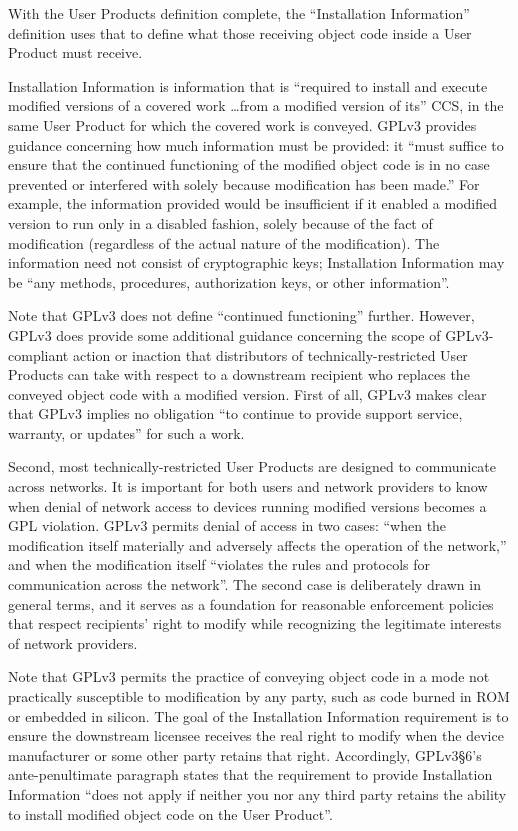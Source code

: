 With the User Products definition complete, the ``Installation Information''
definition uses that to define what those receiving object code inside a User
Product must receive.

Installation Information is information that is ``required to install and
execute modified versions of a covered work \dots from a modified version of
its'' CCS, in the same User Product for which the covered work is conveyed.
GPLv3 provides guidance concerning how much information must be provided: it
``must suffice to ensure that the continued functioning of the modified
object code is in no case prevented or interfered with solely because
modification has been made.''  For example, the information provided would be
insufficient if it enabled a modified version to run only in a disabled
fashion, solely because of the fact of modification (regardless of the actual
nature of the modification).  The information need not consist of
cryptographic keys; Installation Information may be ``any methods,
procedures, authorization keys, or other information''.

Note that GPLv3 does not define ``continued functioning'' further.  However,
GPLv3 does provide some additional guidance concerning the scope of
GPLv3-compliant action or inaction that distributors of
technically-restricted User Products can take with respect to a downstream
recipient who replaces the conveyed object code with a modified version.
First of all, GPLv3 makes clear that GPLv3 implies no obligation ``to
continue to provide support service, warranty, or updates'' for such a work.

Second, most technically-restricted User Products are designed to communicate
across networks.  It is important for both users and network providers to
know when denial of network access to devices running modified versions
becomes a GPL violation.  GPLv3 permits denial of access in two cases: ``when
the modification itself materially and adversely affects the operation of the
network,'' and when the modification itself ``violates the rules and
protocols for communication across the network''.  The second case is
deliberately drawn in general terms, and it serves as a foundation for
reasonable enforcement policies that respect recipients' right to modify
while recognizing the legitimate interests of network providers.

Note that GPLv3 permits the practice of conveying object code in a mode not
practically susceptible to modification by any party, such as code burned in
ROM or embedded in silicon.  The goal of the Installation Information
requirement is to ensure the downstream licensee receives the real right to
modify when the device manufacturer or some other party retains that right.
Accordingly, GPLv3\S6's ante-penultimate paragraph states that the
requirement to provide Installation Information ``does not apply if neither
you nor any third party retains the ability to install modified object code
on the User Product''.

